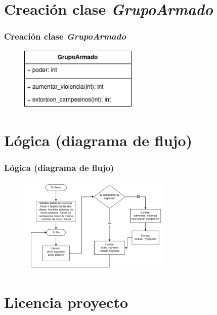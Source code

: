 \documentclass[17pt, t, lualatex]{beamer}
\begin{document}
\section{Creación clase \textit{GrupoArmado}}

\insertsectionpage

\begin{frame}
  \frametitle{Creación clase \textit{GrupoArmado}}
  \begin{figure}[ht]
    \centering
    \includegraphics[width = 0.5\textwidth]{img/ClaseGrupoArmado.png}
  \end{figure}
\end{frame}

    
\section{Lógica (diagrama de flujo)}

\insertsectionpage

\begin{frame}
  \frametitle{Lógica (diagrama de flujo)}
  \begin{figure}[ht]
    \centering
    \includegraphics[width = 0.65\textwidth]{img/img3.png}
  \end{figure}
\end{frame}


\section{Licencia proyecto}

\insertsectionpage
\end{document}

